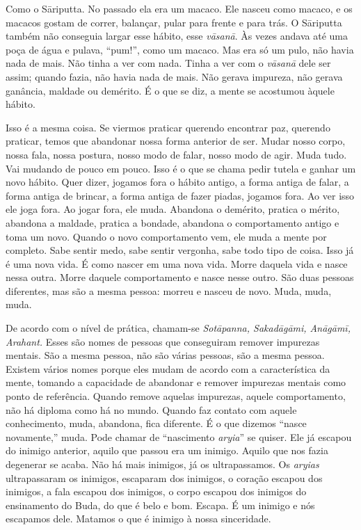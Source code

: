 Como o Sāriputta. No passado ela era um macaco. Ele nasceu como
macaco, e os macacos gostam de correr, balançar, pular para frente e
para trás. O Sāriputta também não conseguia largar esse hábito, esse
\textit{vāsanā}. Às vezes andava até uma poça de água e pulava,
“pum!”, como um macaco. Mas era só um pulo, não havia nada de mais. Não
tinha a ver com nada. Tinha a ver com o \textit{vāsanā} dele ser
assim; quando fazia, não havia nada de mais. Não gerava impureza, não
gerava ganância, maldade ou demérito. É o que se diz, a mente se
acostumou àquele hábito. 

Isso é a mesma coisa. Se viermos praticar querendo encontrar paz,
querendo praticar, temos que abandonar nossa forma anterior de ser.
Mudar nosso corpo, nossa fala, nossa postura, nosso modo de falar,
nosso modo de agir. Muda tudo. Vai mudando de pouco em pouco. Isso é o
que se chama pedir tutela e ganhar um novo hábito. Quer dizer, jogamos
fora o hábito antigo, a forma antiga de falar, a forma antiga de
brincar, a forma antiga de fazer piadas, jogamos fora. Ao ver isso ele
joga fora. Ao jogar fora, ele muda. Abandona o demérito, pratica o
mérito, abandona a maldade, pratica a bondade, abandona o comportamento
antigo e toma um novo. Quando o novo comportamento vem, ele muda a
mente por completo. Sabe sentir medo, sabe sentir vergonha, sabe todo
tipo de coisa. Isso já é uma nova vida. É como nascer em uma nova vida.
Morre daquela vida e nasce nessa outra. Morre daquele comportamento e
nasce nesse outro. São duas pessoas diferentes, mas são a mesma pessoa:
morreu e nasceu de novo. Muda, muda, muda. 

De acordo com o nível de prática, chamam-se \textit{Sotāpanna,
Sakadāgāmi, Anāgāmī, Arahant.} Esses são nomes de pessoas
que conseguiram remover impurezas mentais. São a mesma pessoa, não são
várias pessoas, são a mesma pessoa. Existem vários nomes porque eles
mudam de acordo com a característica da mente, tomando a capacidade de
abandonar e remover impurezas mentais como ponto de referência. Quando
remove aquelas impurezas, aquele comportamento, não há diploma como há
no mundo. Quando faz contato com aquele conhecimento, muda, abandona,
fica diferente. É o que dizemos “nasce novamente,” muda. Pode chamar de
“nascimento \textit{aryia}” se quiser. Ele já escapou do inimigo
anterior, aquilo que passou era um inimigo. Aquilo que nos fazia
degenerar se acaba. Não há mais inimigos, já os ultrapassamos. Os
\textit{aryias} ultrapassaram os inimigos, escaparam dos inimigos, o
coração escapou dos inimigos, a fala escapou dos inimigos, o corpo
escapou dos inimigos do ensinamento do Buda, do que é belo e bom.
Escapa. É um inimigo e nós escapamos dele. Matamos o que é inimigo à
nossa sinceridade. 

